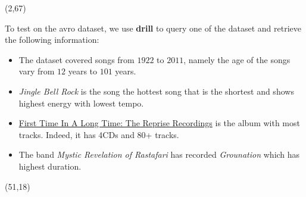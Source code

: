 \documentclass[hyperref={pdfpagelabels=false}]{beamer}
\begin{document}
\begin{frame}
\begin{textblock}{45}(2,67)
	\begin{basebox}[title=Basic Database Query,opacitybacktitle=.45,colframe=grey!65!black,colbacktitle=green!10, halign title=left]
		To test on the avro dataset, we use \textbf{drill} to query one of the dataset and retrieve the following information: 
		\vspace{0.3 cm}
		\begin{itemize}
		\item The dataset covered songs from $1922$ to $2011$, namely the age of the songs vary from $12$ years to $101$ years.
		\item \textit{Jingle Bell Rock} is the song the hottest song that is the shortest and shows highest energy with lowest tempo.
		\item \href{https://www.discogs.com/release/4483625-Fanny-First-Time-In-A-Long-Time-The-Reprise-Recordings}{First Time In A Long Time: The Reprise Recordings} is the album with most tracks. Indeed, it has 4CDs and 80+ tracks.
		\item The band \textit{Mystic Revelation of Rastafari} has recorded \textit{Grounation} which has highest duration.
		\end{itemize}
	\end{basebox}
\end{textblock}



\begin{textblock}{48}(51,18)

	\begin{basebox}[frogbox,title=Big Data Recommendation, opacitybacktitle=.45,colframe=grey!65!black,colbacktitle=green!10, halign title=left]
    \bigskip
    

\end{basebox}
\end{textblock}
\end{frame}
\end{document}
